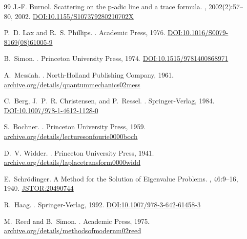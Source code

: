 \documentclass{article}
\numberwithin{equation}{section}
\theoremstyle{plain}
\theoremstyle{definition}
\theoremstyle{remark}
\def\phi{φ}\def\Phi{Φ}\def\psi{ψ}\def\Psi{Ψ}%
\begin{document}
\begin{thebibliography}{99}
J.-F. Burnol.
\newblock Scattering on the p-adic line and a trace formula.
, 2002(2):57--80, 2002.
\href{https://doi.org/10.1155/S107379280210702X}{DOI:10.1155/S107379280210702X}

P.~D. Lax and R.~S. Phillips.
.
\newblock Academic Press, 1976.
\href{https://doi.org/10.1016/S0079-8169(08)61005-9}{DOI:10.1016/S0079-8169(08)61005-9}


B.~Simon.
\newblock {\em The $P(\phi)_2$ Euclidean (Quantum) Field Theory}.
\newblock Princeton University Press, 1974.
\href{https://doi.org/10.1515/9781400868971}{DOI:10.1515/9781400868971}

A.~Messiah.
.
\newblock North-Holland Publishing Company, 1961.
\href{https://archive.org/details/quantummechanics02mess}{archive.org/details/quantummechanics02mess}

C.~Berg, J.~P.~R. Christensen, and P.~Ressel.
.
\newblock Springer-Verlag, 1984.
\href{https://doi.org/10.1007/978-1-4612-1128-0}{DOI:10.1007/978-1-4612-1128-0}

S.~Bochner.
.
\newblock Princeton University Press, 1959.
\href{https://archive.org/details/lecturesonfourie0000boch}{archive.org/details/lecturesonfourie0000boch}

D.~V. Widder.
.
\newblock Princeton University Press, 1941.
\href{https://archive.org/details/laplacetransform0000widd}{archive.org/details/laplacetransform0000widd}

E.~Schr{\"o}dinger.
\newblock A Method for the Solution of Eigenvalue Problems.
, 46:9--16, 1940.
\href{https://www.jstor.org/stable/20490744}{JSTOR:20490744}

R.~Haag.
.
\newblock Springer-Verlag, 1992.
\href{https://doi.org/10.1007/978-3-642-61458-3}{DOI:10.1007/978-3-642-61458-3}

M.~Reed and B.~Simon.
.
\newblock Academic Press, 1975.
\href{https://archive.org/details/methodsofmodernm02reed}{archive.org/details/methodsofmodernm02reed}


\end{thebibliography}
\end{document}

